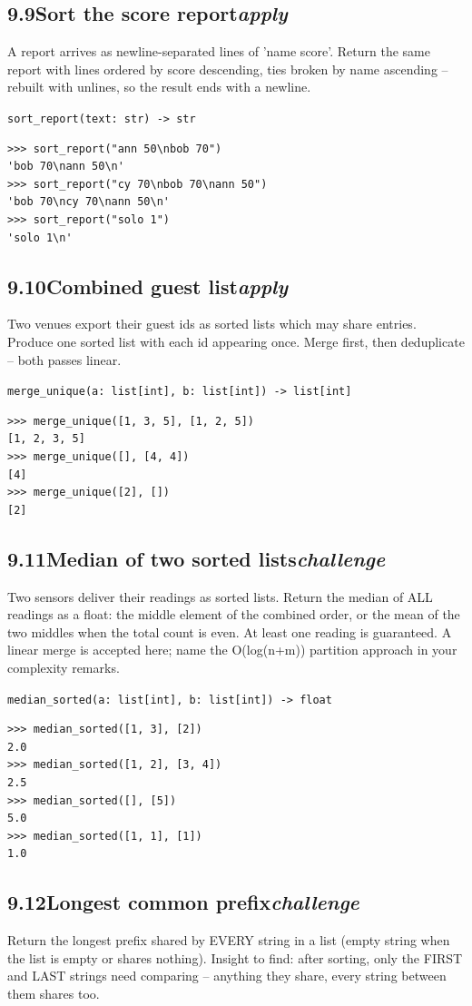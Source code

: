 \documentclass[10pt,letterpaper]{book}
\begin{document}
\subsection*{9.9\quad Sort the score report\hfill\textnormal{\textit{apply}}}
A report arrives as newline-separated lines of 'name score'. Return the same report with lines ordered by score descending, ties broken by name ascending -- rebuilt with unlines, so the result ends with a newline.

\noindent\texttt{sort\_report(text: str) -> str}
\begin{lstlisting}[style=ex]
>>> sort_report("ann 50\nbob 70")
'bob 70\nann 50\n'
>>> sort_report("cy 70\nbob 70\nann 50")
'bob 70\ncy 70\nann 50\n'
>>> sort_report("solo 1")
'solo 1\n'
\end{lstlisting}
\subsection*{9.10\quad Combined guest list\hfill\textnormal{\textit{apply}}}
Two venues export their guest ids as sorted lists which may share entries. Produce one sorted list with each id appearing once. Merge first, then deduplicate -- both passes linear.

\noindent\texttt{merge\_unique(a: list[int], b: list[int]) -> list[int]}
\begin{lstlisting}[style=ex]
>>> merge_unique([1, 3, 5], [1, 2, 5])
[1, 2, 3, 5]
>>> merge_unique([], [4, 4])
[4]
>>> merge_unique([2], [])
[2]
\end{lstlisting}
\subsection*{9.11\quad Median of two sorted lists\hfill\textnormal{\textit{challenge}}}
Two sensors deliver their readings as sorted lists. Return the median of ALL readings as a float: the middle element of the combined order, or the mean of the two middles when the total count is even. At least one reading is guaranteed. A linear merge is accepted here; name the O(log(n+m)) partition approach in your complexity remarks.

\noindent\texttt{median\_sorted(a: list[int], b: list[int]) -> float}
\begin{lstlisting}[style=ex]
>>> median_sorted([1, 3], [2])
2.0
>>> median_sorted([1, 2], [3, 4])
2.5
>>> median_sorted([], [5])
5.0
>>> median_sorted([1, 1], [1])
1.0
\end{lstlisting}
\subsection*{9.12\quad Longest common prefix\hfill\textnormal{\textit{challenge}}}
Return the longest prefix shared by EVERY string in a list (empty string when the list is empty or shares nothing). Insight to find: after sorting, only the FIRST and LAST strings need comparing -- anything they share, every string between them shares too.
\end{document}
